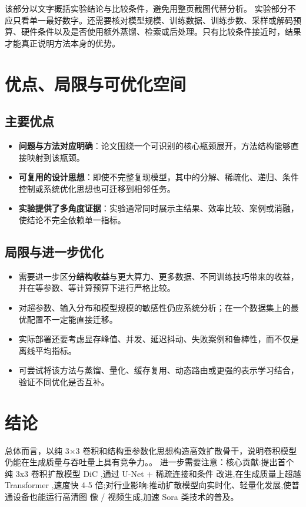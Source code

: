 \documentclass[UTF8,11pt,a4paper]{ctexart}
\newcommand{\term}[1]{\textbf{\textcolor{mainblue}{#1}}}
\begin{document}
该部分以文字概括实验结论与比较条件，避免用整页截图代替分析。
实验部分不应只看单一最好数字。还需要核对模型规模、训练数据、训练步数、采样或解码预算、硬件条件以及是否使用额外蒸馏、检索或后处理。只有比较条件接近时，结果才能真正说明方法本身的优势。

\section{优点、局限与可优化空间}
\subsection{主要优点}
\begin{itemize}
\item \term{问题与方法对应明确}：论文围绕一个可识别的核心瓶颈展开，方法结构能够直接映射到该瓶颈。
\item \term{可复用的设计思想}：即使不完整复现模型，其中的分解、稀疏化、递归、条件控制或系统优化思想也可迁移到相邻任务。
\item \term{实验提供了多角度证据}：实验通常同时展示主结果、效率比较、案例或消融，使结论不完全依赖单一指标。
\end{itemize}

\subsection{局限与进一步优化}
\begin{itemize}
\item 需要进一步区分\term{结构收益}与更大算力、更多数据、不同训练技巧带来的收益，并在等参数、等计算预算下进行严格比较。
\item 对超参数、输入分布和模型规模的敏感性仍应系统分析；在一个数据集上的最优配置不一定能直接迁移。
\item 实际部署还要考虑显存峰值、并发、延迟抖动、失败案例和鲁棒性，而不仅是离线平均指标。
\item 可尝试将该方法与蒸馏、量化、缓存复用、动态路由或更强的表示学习结合，验证不同优化是否互补。
\end{itemize}

\section{结论}
总体而言，以纯 3×3 卷积和结构重参数化思想构造高效扩散骨干，说明卷积模型仍能在生成质量与吞吐量上具有竞争力。。 进一步需要注意：核心贡献:提出首个纯 3x3 卷积扩散模型 DiC ,通过 U-Net + 稀疏连接和条件 改进,在生成质量上超越 Transformer ,速度快 4-5 倍;对行业影响:推动扩散模型向实时化、轻量化发展,使普通设备也能运行高清图 像 / 视频生成,加速 Sora 类技术的普及。
\end{document}
